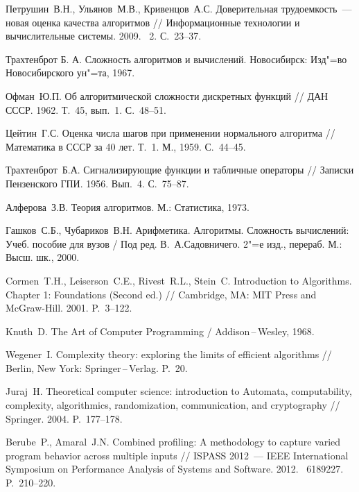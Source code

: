 \documentclass[a4paper, article, 14pt]{extarticle}
\newcommand*{\No}{\textnumero}
\begin{document}
\begin{thebibliography}{1}\label{sec:sources}
	 Петрушин~В.\:Н., Ульянов~М.\:В., Кривенцов~А.\:С. Доверительная трудоемкость~--- новая оценка качества алгоритмов // Информационные технологии и вычислительные системы. 2009. \No~2. С.~23--37.

	 Трахтенброт Б. А. Сложность алгоритмов и вычислений. Новосибирск: Изд"=во Новосибирского ун"=та, 1967.

	 Офман~Ю.\:П. Об алгоритмической сложности дискретных функций // ДАН СССР. 1962. Т.~45, вып.~1. С.~48--51.

	 Цейтин~Г.\:С. Оценка числа шагов при применении нормального алгоритма // Математика в СССР за 40 лет. Т.~1. М., 1959. С.~44--45.

	 Трахтенброт~Б.\:А. Сигнализирующие функции и табличные операторы // Записки Пензенского ГПИ. 1956. Вып.~4. С.~75--87.
	
	 Алферова~З.\:В. Теория алгоритмов. М.: Статистика, 1973.

	 Гашков~С.\:Б., Чубариков~В.\:Н. Арифметика. Алгоритмы. Сложность вычислений: Учеб. пособие для вузов / Под ред. В.~А.\:Садовничего. 2"=е изд., перераб. М.: Высш. шк., 2000.

	 Cormen~T.\:H., Leiserson~C.\:E., Rivest~R.\:L., Stein~C. Introduction to Algorithms. Chapter 1: Foundations (Second ed.) // Cambridge, MA: MIT Press and McGraw-Hill. 2001. P.~3--122.

	 Knuth~D. The Art of Computer Programming / Addison\,--\,Wesley, 1968.

	 Wegener~I. Complexity theory: exploring the limits of efficient algorithms // Berlin, New York: Springer\,--\,Verlag. P.~20.

	 Juraj~H. Theoretical computer science: introduction to Automata, computability, complexity, algorithmics, randomization, communication, and cryptography // Springer. 2004. P.~177--178.

	 Berube~P., Amaral~J.\:N. Combined profiling: A methodology to capture varied program behavior across multiple inputs // ISPASS 2012~--- IEEE International Symposium on Performance Analysis of Systems and Software. 2012. \No~6189227. P.~210--220.


\end{thebibliography}
\end{document}
